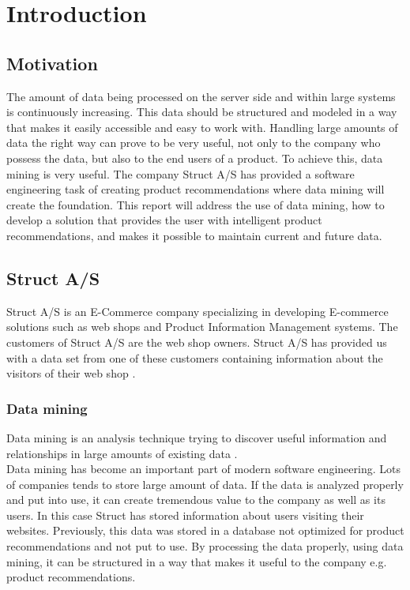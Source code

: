 
\chapter{Introduction} %

\label{ChapterX} %


\section{Motivation}
The amount of data being processed on the server side and within large systems is continuously increasing. This data should be structured and modeled in a way that makes it easily accessible and easy to work with. Handling large amounts of data the right way can prove to be very useful, not only to the company who possess the data, but also to the end users of a product. To achieve this, data mining is very useful.
The company Struct A/S has provided a software engineering task of creating product recommendations where data mining will create the foundation. This report will address the use of data mining, how to develop a solution that provides the user with intelligent product recommendations, and makes it possible to maintain current and future data.

\section{Struct A/S}
Struct A/S is an E-Commerce company specializing in developing E-commerce solutions such as web shops and Product Information Management systems. The customers of Struct A/S are the web shop owners. Struct A/S has provided us with a data set from one of these customers containing information about the visitors of their web shop \cite{Struct}.

\subsection{Data mining}
Data mining is an analysis technique trying to discover useful information and relationships in large amounts of existing data \cite{dataminingSource}. \\  
Data mining has become an important part of modern software engineering. Lots of companies tends to store large amount of data. If the data is analyzed properly and put into use, it can create tremendous value to the company as well as its users. In this case Struct has stored information about users visiting their websites. Previously, this data was stored in a database not optimized for product recommendations and not put to use. By processing the data properly, using data mining, it can be structured in a way that makes it useful to the company e.g. product recommendations.

